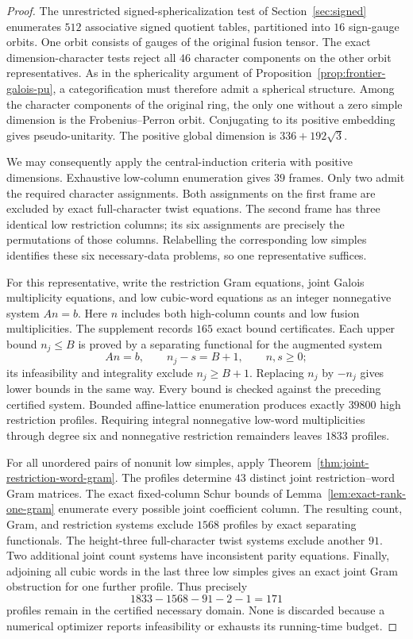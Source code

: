 \begin{proof}
The unrestricted signed-sphericalization test of Section~\ref{sec:signed}
enumerates $512$ associative signed quotient tables, partitioned into
$16$ sign-gauge orbits. One orbit consists of gauges of the original
fusion tensor. The exact dimension-character tests reject all $46$
character components on the other orbit representatives. As in the
sphericality argument of Proposition~\ref{prop:frontier-galois-pu}, a
categorification must therefore admit a spherical structure. Among the
character components of the original ring, the only one without a zero
simple dimension is the Frobenius--Perron orbit. Conjugating to its
positive embedding gives pseudo-unitarity. The positive global dimension
is $336+192\sqrt3$.

We may consequently apply the central-induction criteria with positive
dimensions. Exhaustive low-column enumeration gives $39$ frames. Only
two admit the required character assignments. Both assignments on the
first frame are excluded by exact full-character twist equations. The
second frame has three identical low restriction columns; its six
assignments are precisely the permutations of those columns. Relabelling
the corresponding low simples identifies these six necessary-data
problems, so one representative suffices.

For this representative, write the restriction Gram equations, joint
Galois multiplicity equations, and low cubic-word equations as an
integer nonnegative system $An=b$. Here $n$ includes both high-column
counts and low fusion multiplicities. The supplement records $165$
exact bound certificates. Each upper bound $n_j\le B$ is proved by a
separating functional for the augmented system
\[
 An=b,\qquad n_j-s=B+1,\qquad n,s\ge0;
\]
its infeasibility and integrality exclude $n_j\ge B+1$. Replacing $n_j$
by $-n_j$ gives lower bounds in the same way. Every bound is checked
against the preceding certified system. Bounded affine-lattice
enumeration produces exactly $39800$
high restriction profiles. Requiring integral nonnegative low-word
multiplicities through degree six and nonnegative restriction remainders
leaves $1833$ profiles.

For all unordered pairs of nonunit low simples, apply
Theorem~\ref{thm:joint-restriction-word-gram}. The profiles determine
$43$ distinct joint restriction--word Gram matrices. The exact fixed-column
Schur bounds of Lemma~\ref{lem:exact-rank-one-gram} enumerate every possible
joint coefficient column. The resulting count, Gram, and restriction
systems exclude $1568$ profiles by exact separating functionals. The
height-three full-character twist systems exclude another $91$.
Two additional joint count systems have inconsistent parity equations.
Finally, adjoining all cubic words in the last three low simples gives
an exact joint Gram obstruction for one further profile. Thus precisely
\[
 1833-1568-91-2-1=171
\]
profiles remain in the certified necessary domain. None is discarded
because a numerical optimizer reports infeasibility or exhausts its
running-time budget.


\end{proof}
